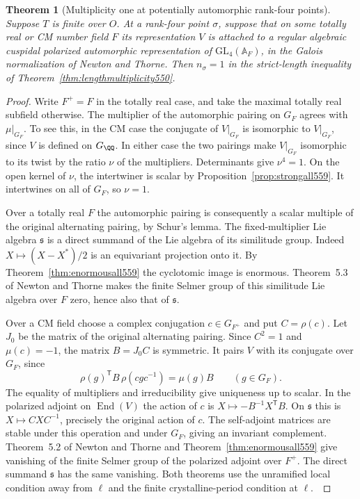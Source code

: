 \documentclass[a4paper,11pt]{article}
\newtheorem{theorem}[proposition]{Theorem}
\theoremstyle{definition}
\theoremstyle{remark}
\numberwithin{equation}{section}
\begin{document}
\begin{theorem}[Multiplicity one at potentially automorphic rank-four points]
\leavevmode\label{thm:automult559}
Suppose \(T\) is finite over \(O\). At a rank-four point
\(\sigma\), suppose that on some totally real or CM number
field \(F\) its representation \(V\) is attached to a regular
algebraic cuspidal polarized automorphic representation of
\(\mathrm{GL}_4(\mathbb A_F)\), in the Galois normalization of
Newton and Thorne. Then \(n_\sigma=1\) in the strict-length
inequality of Theorem~\ref{thm:lengthmultiplicity550}.
\end{theorem}
\begin{proof}
Write \(F^+=F\) in the totally real case, and take the maximal
totally real subfield otherwise. The multiplier of the automorphic
pairing on \(G_F\) agrees with \(\mu|_{G_F}\). To see this, in
the CM case the conjugate of \(V|_{G_F}\) is isomorphic to
\(V|_{G_F}\), since \(V\) is defined on \(G_\QQ\). In either
case the two pairings make \(V|_{G_F}\) isomorphic to its twist
by the ratio \(\nu\) of the multipliers. Determinants give
\(\nu^4=1\). On the open kernel of \(\nu\), the intertwiner is
scalar by Proposition~\ref{prop:strongall559}. It intertwines
on all of \(G_F\), so \(\nu=1\).

Over a totally real \(F\) the automorphic pairing is consequently
a scalar multiple of the original alternating pairing, by Schur's
lemma. The fixed-multiplier Lie algebra \(\mathfrak s\) is a
direct summand of the Lie algebra of its similitude group. Indeed
\(X\mapsto(X-X^*)/2\) is an equivariant projection onto it.
By Theorem~\ref{thm:enormousall559} the cyclotomic image is
enormous. Theorem~5.3 of Newton and Thorne makes the finite
Selmer group of this similitude Lie algebra over \(F\) zero,
hence also that of \(\mathfrak s\).

Over a CM field choose a complex conjugation \(c\in G_{F^+}\)
and put \(C=\rho(c)\). Let \(J_0\) be the matrix of the original
alternating pairing. Since \(C^2=1\) and \(\mu(c)=-1\), the
matrix \(B=J_0 C\) is symmetric. It pairs \(V\) with its
conjugate over \(G_F\), since
\[
     \rho(g)^{\mathsf T} B\,\rho(cgc^{-1})=\mu(g)B
                           \qquad(g\in G_F).
\]
The equality of multipliers and irreducibility give uniqueness
up to scalar. In the polarized adjoint on \(\operatorname{End}(V)\)
the action of \(c\) is \(X\mapsto -B^{-1}X^{\mathsf T}B\).
On \(\mathfrak s\) this is \(X\mapsto CXC^{-1}\), precisely
the original action of \(c\). The self-adjoint matrices are
stable under this operation and under \(G_F\), giving an
invariant complement. Theorem~5.2 of Newton and Thorne and
Theorem~\ref{thm:enormousall559} give vanishing of the finite
Selmer group of the polarized adjoint over \(F^+\).
The direct summand \(\mathfrak s\) has the same vanishing.
Both theorems use the unramified local condition away from
\(\ell\) and the finite crystalline-period condition at
\(\ell\).~\cite{IX-VII-VI-nt119}


\end{proof}
\end{document}
